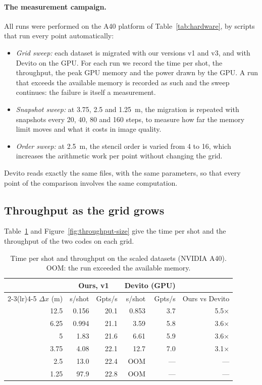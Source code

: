 \documentclass[letterpaper,11pt,leqno]{article}
\begin{document}
\paragraph{The measurement campaign.}
All runs were performed on the A40 platform of Table~\ref{tab:hardware}, by
scripts that run every point automatically:
\begin{itemize}
\item \emph{Grid sweep:} each dataset is migrated with our versions v1 and v3,
  and with Devito on the GPU. For each run we record the time per shot, the
  throughput, the peak GPU memory and the power drawn by the GPU. A run that
  exceeds the available memory is recorded as such and the sweep continues:
  the failure is itself a measurement.
\item \emph{Snapshot sweep:} at 3.75, 2.5 and 1.25~m, the migration is repeated
  with snapshots every 20, 40, 80 and 160 steps, to measure how far the memory
  limit moves and what it costs in image quality.
\item \emph{Order sweep:} at 2.5~m, the stencil order is varied from 4 to 16,
  which increases the arithmetic work per point without changing the grid.
\end{itemize}
Devito reads exactly the same files, with the same parameters, so that every
point of the comparison involves the same computation.

\subsection{Throughput as the grid grows}\label{s:scaling}

Table~\ref{tab:scaling} and Figure~\ref{fig:throughput-size} give the time per
shot and the throughput of the two codes on each grid.

\begin{table}[H]
\centering
\caption{Time per shot and throughput on the scaled datasets (NVIDIA A40).
OOM: the run exceeded the available memory.}
\label{tab:scaling}
\begin{tabular}{rrrrrr}
\toprule
       & \multicolumn{2}{c}{Ours, v1} & \multicolumn{2}{c}{Devito (GPU)} & \\
\cmidrule(lr){2-3}\cmidrule(lr){4-5}
$\Delta x$ (m) & s/shot & Gpts/s & s/shot & Gpts/s & Ours vs Devito \\
\midrule
12.5 & 0.156 & 20.1 & 0.853 & 3.7 & 5.5$\times$ \\
6.25 & 0.994 & 21.1 & 3.59  & 5.8 & 3.6$\times$ \\
5    & 1.83  & 21.6 & 6.61  & 5.9 & 3.6$\times$ \\
3.75 & 4.08  & 22.1 & 12.7  & 7.0 & 3.1$\times$ \\
2.5  & 13.0  & 22.4 & OOM   & --- & --- \\
1.25 & 97.9  & 22.8 & OOM   & --- & --- \\
\bottomrule
\end{tabular}
\end{table}
\end{document}
